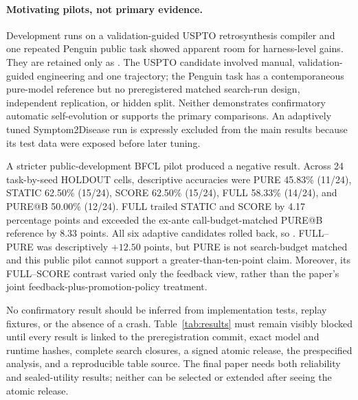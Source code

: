 \paragraph{Motivating pilots, not primary evidence.}
Development runs on a validation-guided USPTO retrosynthesis compiler and one
repeated Penguin public task showed apparent room for harness-level gains.
They are retained only as
.
The USPTO candidate involved manual, validation-guided engineering and one
trajectory; the Penguin task has a contemporaneous pure-model reference but no
preregistered matched search-run design, independent replication, or hidden
split.  Neither demonstrates confirmatory automatic self-evolution or supports
the primary comparisons.  An adaptively tuned Symptom2Disease run is expressly
excluded from the main results because its test data were exposed before later
tuning.

A stricter public-development BFCL pilot produced a negative result.  Across 24
task-by-seed HOLDOUT cells, descriptive accuracies were PURE 45.83\% (11/24),
STATIC 62.50\% (15/24), SCORE 62.50\% (15/24), FULL 58.33\% (14/24), and
PURE@B 50.00\% (12/24).  FULL trailed STATIC and SCORE by 4.17 percentage
points and exceeded the ex-ante call-budget-matched PURE@B reference by 8.33
points.  All six adaptive candidates rolled back, so
.
FULL--PURE was descriptively $+12.50$ points, but PURE is not search-budget
matched and this public pilot cannot support a greater-than-ten-point claim.
Moreover, its FULL--SCORE contrast varied only the feedback view, rather than
the paper's joint feedback-plus-promotion-policy treatment.

No confirmatory result should be inferred from implementation tests, replay
fixtures, or the absence of a crash.  Table~\ref{tab:results} must remain visibly
blocked until every result is linked to the preregistration commit, exact model
and runtime hashes, complete search closures, a signed atomic release, the
prespecified analysis, and a reproducible table source.  The final paper needs
both reliability and sealed-utility results; neither can be selected or extended
after seeing the atomic release.
